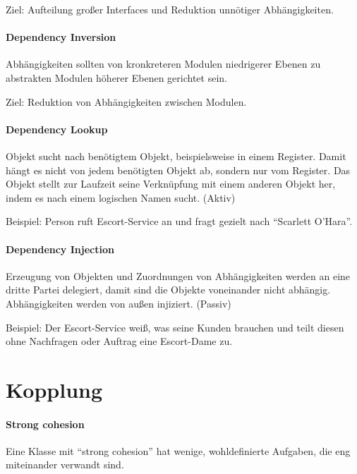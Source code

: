 Ziel: Aufteilung großer Interfaces und Reduktion unnötiger
Abhängigkeiten.

\paragraph{Dependency Inversion}\label{dependency-inversion}

Abhängigkeiten sollten von kronkreteren Modulen niedrigerer Ebenen zu
abstrakten Modulen höherer Ebenen gerichtet sein.

Ziel: Reduktion von Abhängigkeiten zwischen Modulen.

\paragraph{Dependency Lookup}\label{dependency-lookup}

Objekt sucht nach benötigtem Objekt, beispielsweise in einem Register.
Damit hängt es nicht von jedem benötigten Objekt ab, sondern nur vom
Register. Das Objekt stellt zur Laufzeit seine Verknüpfung mit einem
anderen Objekt her, indem es nach einem logischen Namen sucht. (Aktiv)

Beispiel: Person ruft Escort-Service an und fragt gezielt nach
``Scarlett O'Hara''.

\paragraph{Dependency Injection}\label{dependency-injection}

Erzeugung von Objekten und Zuordnungen von Abhängigkeiten werden an eine
dritte Partei delegiert, damit sind die Objekte voneinander nicht
abhängig. Abhängigkeiten werden von außen injiziert. (Passiv)

Beispiel: Der Escort-Service weiß, was seine Kunden brauchen und teilt
diesen ohne Nachfragen oder Auftrag eine Escort-Dame zu.

\section{Kopplung}\label{kopplung}

\paragraph{Strong cohesion}\label{strong-cohesion}

Eine Klasse mit ``strong cohesion'' hat wenige, wohldefinierte Aufgaben,
die eng miteinander verwandt sind.

